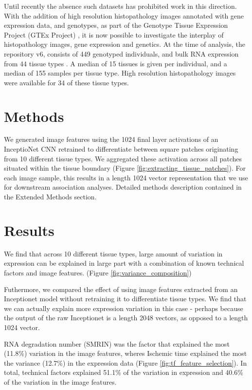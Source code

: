 \documentclass{article}
\begin{document}
Until recently the absence such datasets has prohibited work in this direction. With the addition of high resolution histopathology images annotated with gene expression data, and genotypes, as part of the Genotype Tissue Expression Project (GTEx Project) \cite{GTEx-project}, it is now possible to investigate the interplay of histopathology images, gene expression and genetics. At the time of analysis, the repository v6, consists of 449 genotyped individuals, and bulk RNA expression from 44 tissue types \cite{GTEx-histology}. A median of 15 tissues is given per individual, and a median of 155 samples per tissue type. High resolution histopathology images were available for 34 of these tissue types.

\section{Methods}

We generated image features using the 1024 final layer activations of an InceptioNet CNN retrained to differentiate between square patches originating from 10 different tissue types. We aggregated these activation across all patches situated within the tissue boundary (Figure \ref{fig:extracting_tissue_patches}). For each image sample, this results in a length 1024 vector representation that we use for downstream association analyses. Detailed methods description contained in the Extended Methods section.

\section{Results}
We find that across 10 different tissue types, large amount of variation in expression can be explained in large part with a combination of known technical factors and image features. (Figure \ref{fig:variance_composition})

Futhermore, we compared the effect of using image features extracted from an Inceptionet model without retraining it to differentiate tissue types. We find that we can actually explain more expression variation in this case - perhaps because the output of the raw Inceptionet is a length 2048 vectors, as opposed to a length 1024 vector. 

RNA degradation number (SMRIN) was the factor that explained the most (11.8\%) variation in the image features, wheres Ischemic time explained the most the variance (12.7\%) in the expression data (Figure \ref{fig:tf_feature_selection}). In total, technical factors explained 51.1\% of the variation in expression and 40.6\% of the variation in the image features.
\end{document}

